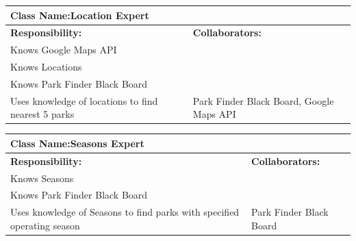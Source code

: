 \documentclass[titlepage,12pt]{article}
\begin{document}
 				\begin{table}[H]
 					\centering
 					\begin{tabular}{|p{5cm}|p{5cm}|}
 						\hline 
 						\multicolumn{2}{|l|}{\textbf{Class Name:Location Expert}} \\
 						\hline
 						\textbf{Responsibility:} & \textbf{Collaborators:} \\
 						\hline
 						Knows Google Maps API & \\
 						\hline
 						Knows Locations & \\
 						\hline
 						Knows Park Finder Black Board & \\
 						\hline
 						Uses knowledge of locations to find nearest 5 parks &	Park Finder Black Board, Google Maps API \\
 						\hline
 					\end{tabular}
 				\end{table}	
 				
 				\begin{table}[H]
 					\centering
 					\begin{tabular}{|p{5cm}|p{5cm}|}
 						\hline 
 						\multicolumn{2}{|l|}{\textbf{Class Name:Seasons Expert}} \\
 						\hline
 						\textbf{Responsibility:} & \textbf{Collaborators:} \\
 						\hline
 						Knows Seasons & \\
 						\hline
 						Knows Park Finder Black Board & \\
 						\hline
 						Uses knowledge of Seasons to find parks with specified operating season & Park Finder Black Board \\
 						\hline
 					\end{tabular}
 				\end{table}	
 				
\end{document}
